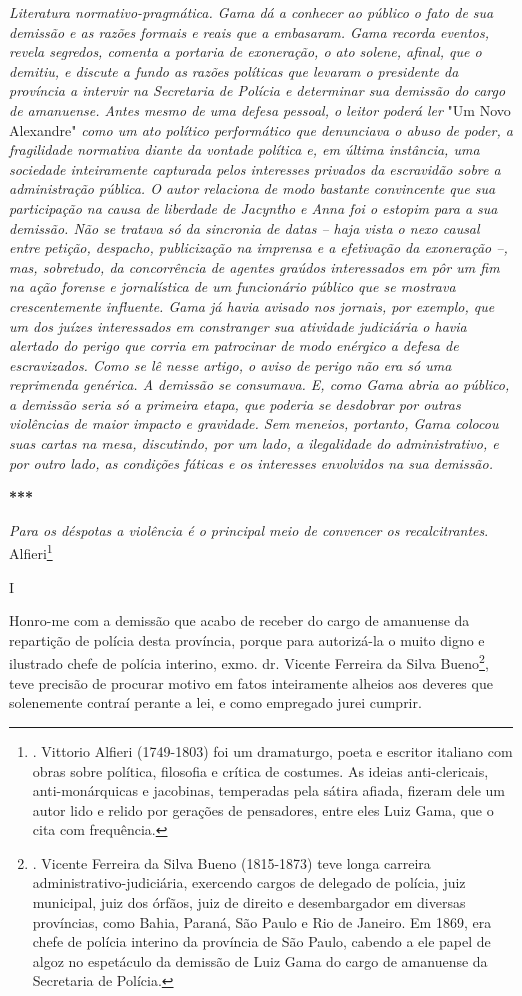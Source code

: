 \emph{Literatura normativo-pragmática. Gama dá a conhecer ao público o
fato de sua demissão e as razões formais e reais que a embasaram. Gama
recorda eventos, revela segredos, comenta a portaria de exoneração, o
ato solene, afinal, que o demitiu, e discute a fundo as razões políticas
que levaram o presidente da província a intervir na Secretaria de
Polícia e determinar sua demissão do cargo de amanuense. Antes mesmo de
uma defesa pessoal, o leitor poderá ler} "Um Novo Alexandre" \emph{como
um ato político performático que denunciava o abuso de poder, a
fragilidade normativa diante da vontade política e, em última instância,
uma sociedade inteiramente capturada pelos interesses privados da
escravidão sobre a administração pública. O autor relaciona de modo
bastante convincente que sua participação na causa de liberdade de
Jacyntho e Anna foi o estopim para a sua demissão. Não se tratava só da
sincronia de datas -- haja vista o nexo causal entre petição, despacho,
publicização na imprensa e a efetivação da exoneração --, mas,
sobretudo, da concorrência de agentes graúdos interessados em pôr um fim
na ação forense e jornalística de um funcionário público que se mostrava
crescentemente influente. Gama já havia avisado nos jornais, por
exemplo, que um dos juízes interessados em constranger sua atividade
judiciária o havia alertado do perigo que corria em patrocinar de modo
enérgico a defesa de escravizados. Como se lê nesse artigo, o aviso de
perigo não era só uma reprimenda genérica. A demissão se consumava. E,
como Gama abria ao público, a demissão seria só a primeira etapa, que
poderia se desdobrar por outras violências de maior impacto e gravidade.
Sem meneios, portanto, Gama colocou suas cartas na mesa, discutindo, por
um lado, a ilegalidade do administrativo, e por outro lado, as condições
fáticas e os interesses envolvidos na sua demissão.}

\textbf{***}

\emph{Para os déspotas a violência é o principal meio de convencer os
recalcitrantes}. Alfieri\footnote{. Vittorio Alfieri (1749-1803) foi um
  dramaturgo, poeta e escritor italiano com obras sobre política,
  filosofia e crítica de costumes. As ideias anti-clericais,
  anti-monárquicas e jacobinas, temperadas pela sátira afiada, fizeram
  dele um autor lido e relido por gerações de pensadores, entre eles
  Luiz Gama, que o cita com frequência.}

I

Honro-me com a demissão que acabo de receber do cargo de amanuense da
repartição de polícia desta província, porque para autorizá-la o muito
digno e ilustrado chefe de polícia interino, exmo. dr. Vicente Ferreira
da Silva Bueno\footnote{. Vicente Ferreira da Silva Bueno (1815-1873)
  teve longa carreira administrativo-judiciária, exercendo cargos de
  delegado de polícia, juiz municipal, juiz dos órfãos, juiz de direito
  e desembargador em diversas províncias, como Bahia, Paraná, São Paulo
  e Rio de Janeiro. Em 1869, era chefe de polícia interino da província
  de São Paulo, cabendo a ele papel de algoz no espetáculo da demissão
  de Luiz Gama do cargo de amanuense da Secretaria de Polícia.}, teve
precisão de procurar motivo em fatos inteiramente alheios aos deveres
que solenemente contraí perante a lei, e como empregado jurei cumprir.

